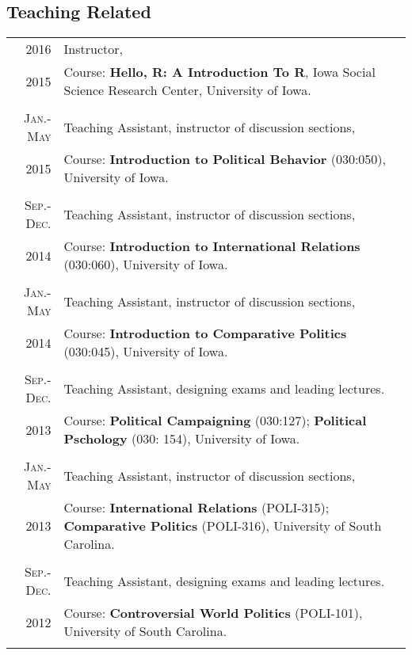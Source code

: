 \documentclass[a4paper,10pt]{article} %
\begin{document}
	\subsection*{Teaching Related}
		\begin{longtable}{r|p{}}	
			\textsc{2016}& Instructor,\\
			2015& \small Course:\textbf{ Hello, R: A Introduction To R}, Iowa Social Science Research Center, University of Iowa.\\
			\multicolumn{2}{c}{} \\
			
			\textsc{Jan.-May}& Teaching Assistant, instructor of discussion sections,\\
			2015& \small Course: \textbf{Introduction to Political Behavior} (030:050), University of Iowa.\\
			\multicolumn{2}{c}{} \\
			
			\textsc{Sep.-Dec.}& Teaching Assistant, instructor of discussion sections, \\
			2014& \small Course: \textbf{Introduction to International Relations} (030:060), University of Iowa.\\
			\multicolumn{2}{c}{} \\
			
			\textsc{Jan.-May}& Teaching Assistant, instructor of discussion sections, \\
			2014& \small Course: \textbf{Introduction to Comparative Politics} (030:045), University of Iowa.\\
			\multicolumn{2}{c}{} \\
			
			\textsc{Sep.-Dec.}& Teaching Assistant, designing exams and leading lectures. \\
			2013& \small Course: \textbf{Political Campaigning }(030:127); \textbf{Political Pschology} (030: 154), University of Iowa.\\
			\multicolumn{2}{c}{} \\
			
			\textsc{Jan.-May}& Teaching Assistant, instructor of discussion sections, \\
			2013& \small Course: \textbf{International Relations} (POLI-315); \textbf{Comparative Politics} (POLI-316), University of South Carolina.\\
			\multicolumn{2}{c}{} \\
			
			\textsc{Sep.-Dec.}& Teaching Assistant, designing exams and leading lectures. \\
			2012& \small Course: \textbf{Controversial World Politics} (POLI-101), University of South Carolina.\\
			\multicolumn{2}{c}{} \\
			

\end{longtable}
\end{document}
